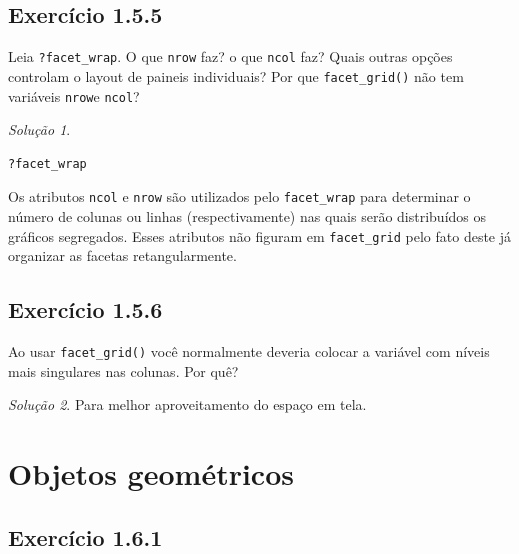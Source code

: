 \documentclass[
]{latex/krantz}
\theoremstyle{definition}
\theoremstyle{definition}
\theoremstyle{definition}
\theoremstyle{definition}
\theoremstyle{remark}
\newtheorem*{solution}{Solução}
\begin{document}
\hypertarget{exr1-5-5}{%
\subsection*{Exercício 1.5.5}\label{exr1-5-5}}

Leia \texttt{?facet\_wrap}. O que \texttt{nrow} faz? o que \texttt{ncol} faz? Quais outras opções controlam o layout de paineis individuais? Por que \texttt{facet\_grid()} não tem variáveis \texttt{nrow}e \texttt{ncol}?

\begin{solution}
\leavevmode

\begin{verbatim}
?facet_wrap
\end{verbatim}

Os atributos \texttt{ncol} e \texttt{nrow} são utilizados pelo \texttt{facet\_wrap} para determinar o número de colunas ou linhas (respectivamente) nas quais serão distribuídos os gráficos segregados. Esses atributos não figuram em \texttt{facet\_grid} pelo fato deste já organizar as facetas retangularmente.

\end{solution}

\hypertarget{exr1-5-6}{%
\subsection*{Exercício 1.5.6}\label{exr1-5-6}}

Ao usar \texttt{facet\_grid()} você normalmente deveria colocar a variável com níveis mais singulares nas colunas. Por quê?

\begin{solution}
Para melhor aproveitamento do espaço em tela.
\end{solution}

\hypertarget{objetos-geomuxe9tricos}{%
\section{Objetos geométricos}\label{objetos-geomuxe9tricos}}

\hypertarget{exr1-6-1}{%
\subsection*{Exercício 1.6.1}\label{exr1-6-1}}
\end{document}
